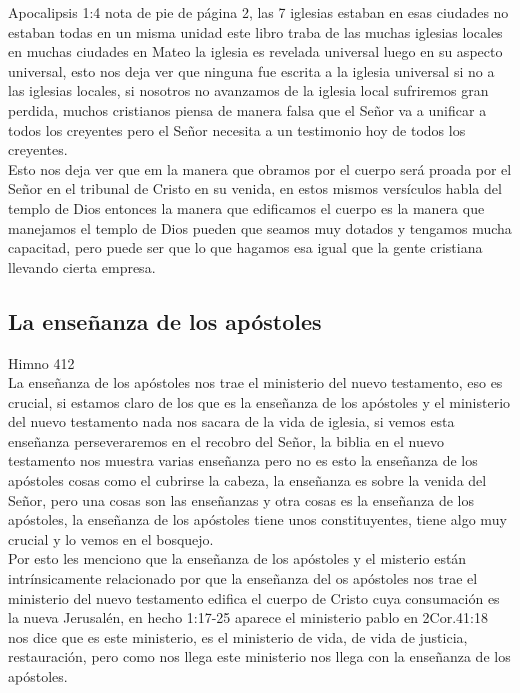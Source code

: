 \documentclass[12pt]{article}
\begin{document}
Apocalipsis 1:4 nota de pie de página 2, las 7 iglesias estaban en esas ciudades no estaban todas en un misma unidad este libro traba de las muchas iglesias locales en muchas ciudades en Mateo la iglesia es revelada universal luego en su aspecto universal, esto nos deja ver que ninguna fue escrita a la iglesia universal si no a las iglesias locales, si nosotros no avanzamos de la iglesia local sufriremos gran perdida, muchos cristianos piensa de manera falsa que el Señor va a unificar a todos los creyentes pero el Señor necesita a un testimonio hoy de todos los creyentes.\\

Esto nos deja ver que em la manera que obramos por el cuerpo será proada por el Señor en el tribunal de Cristo en su venida, en estos mismos versículos habla del templo de Dios entonces la manera que edificamos el cuerpo es la manera que manejamos el templo de Dios pueden que seamos muy dotados y tengamos mucha capacitad, pero puede ser que lo que hagamos esa igual que la gente cristiana llevando cierta empresa.\\

\subsection*{La enseñanza de los apóstoles}

Himno 412\\

La enseñanza de los apóstoles nos trae el ministerio del nuevo testamento, eso es crucial, si estamos claro de los que es la enseñanza de los apóstoles y el ministerio del nuevo testamento nada nos sacara de la vida de iglesia, si vemos esta enseñanza perseveraremos en el recobro del Señor, la biblia en el nuevo testamento nos muestra varias enseñanza pero no es esto la enseñanza de los apóstoles cosas como el cubrirse la cabeza, la enseñanza es sobre la venida del Señor, pero una cosas son las enseñanzas y otra cosas es la enseñanza de los apóstoles, la enseñanza de los apóstoles tiene unos constituyentes, tiene algo muy crucial y lo vemos en el bosquejo.\\

Por esto les menciono que la enseñanza de los apóstoles y el misterio están intrínsicamente relacionado por que la enseñanza del os apóstoles nos trae el ministerio del nuevo testamento edifica el cuerpo de Cristo cuya consumación es la nueva Jerusalén, en hecho 1:17-25 aparece el ministerio pablo en 2Cor.41:18 nos dice que es este ministerio, es el ministerio de vida, de vida de justicia, restauración, pero como nos llega este ministerio nos llega con la enseñanza de los apóstoles.\\
\end{document}
